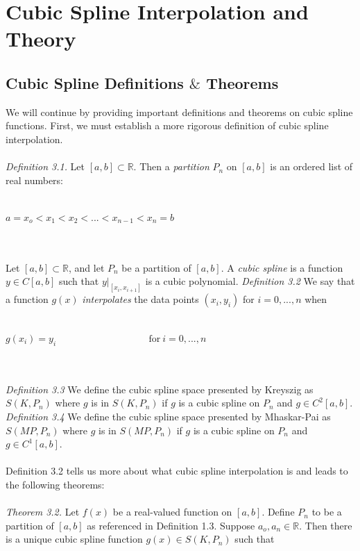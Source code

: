 

\chapter{Cubic Spline Interpolation and Theory}
\label{chapter3}
\thispagestyle{empty}

\section{Cubic Spline Definitions $\&$ Theorems}
We will continue by providing important definitions and theorems on cubic spline functions. First, we must establish a more rigorous definition of cubic spline interpolation.
\\\\
\emph{Definition 3.1.} Let $[a,b] \subset \mathbb{R}$. Then a \emph{partition} $P_n$ on $[a,b]$ is an ordered list of real numbers:
\\\\
\centerline{$ a=x_o < x_1 < x_2 < ... < x_{n-1} < x_{n}=b$}
\\\\
 Let $[a,b] \subset \mathbb{R}$, and let $P_n$ be a partition of $[a,b]$. A \emph{cubic spline} is a function $y \in C[a,b]$ such that $y|_{[x_{i}, x_{i+1}]}$ is a cubic polynomial.\newline
 \emph{Definition 3.2} We say that a function $g(x)$ \emph{interpolates} the data points $(x_i, y_i)$ for $i= 0,...,n$ when
\\\\
\centerline{$g(x_i)=y_i \hspace{4cm} \text{for} \ i=0,...,n$}
\\\\
\emph{Definition 3.3} We define the cubic spline space presented by Kreyszig as $S(K, P_{n})$ where $g$ is in $S(K, P_{n})$ if $g$ is a cubic spline on $P_n$ and $g \in C^2[a,b]$. \newline
\emph{Definition 3.4} We define the cubic spline space presented by Mhaskar-Pai as $S(MP, P_{n})$ where $g$ is in $S(MP, P_{n})$ if $g$ is a cubic spline on $P_{n}$ and $g \in C^1[a,b]$.
\\\\
Definition 3.2 tells us more about what cubic spline interpolation is and leads to the following theorems:
\\\\
\emph{Theorem 3.2.} \cite[pg.~358]{key3} Let $f(x)$ be a real-valued function on $[a,b]$. Define $P_{n}$ to be a partition of $[a,b]$ as referenced in Definition 1.3. Suppose $a_o, a_{n} \in \mathbb{R}$. Then there is a unique cubic spline function $g(x) \in S(K, P_{n})$ such that
